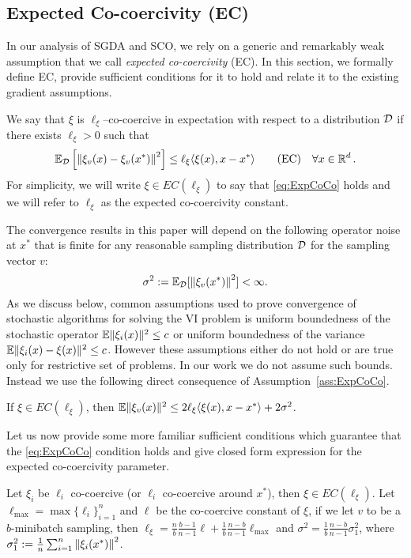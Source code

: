 \documentclass{article}
\begin{document}
\subsection{Expected Co-coercivity (EC)}
In our analysis of SGDA and SCO, we rely on a generic and remarkably weak assumption that we call \emph{expected co-coercivity} (EC).  In this section, we formally define EC, provide sufficient conditions for it to hold and relate it to the existing gradient assumptions.
\begin{assumption}
\label{ass:ExpCoCo} We say that $\xi$ is $\ell_{\xi}$--co-coercive in expectation with respect to a distribution ${\cal D}$ if there exists  $\ell_{\xi}>0$  such that
\begin{equation}
\label{eq:ExpCoCo}
\mathbb{E}_{{\cal D}}\left[\left\| \xi_v(x)-\xi_v(x^*)\right\|^2 \right]\leq \ell_{\xi}\langle \xi (x),x-x^*\rangle \tag{EC} \quad \forall x \in \mathbb{R}^d \, .
\end{equation}
For simplicity, we will write $\xi  \in EC(\ell_\xi)$ to say that \ref{eq:ExpCoCo} holds and we will refer to $\ell_{\xi}$ as the expected co-coercivity constant.
\end{assumption}
The convergence results in this paper will depend on the following operator noise at $x^*$ that is finite for any reasonable sampling distribution ${\cal D}$ for the sampling vector $v$:
\begin{equation}
\label{Sigma}
\sigma^2  := \mathbb{E}_{{\cal D}}[\left\| \xi_v(x^*)\right\|^2] < \infty .
\end{equation}
As we discuss below, common assumptions used to prove convergence of stochastic algorithms for solving the VI problem is uniform boundedness of the stochastic operator $\mathbb{E}\|\xi_i(x)\|^2 \leq c$ or uniform boundedness of the variance  $\mathbb{E}\|\xi_i(x)-\xi(x)\|^2 \leq c$. However these assumptions either do not hold or are true only for restrictive set of problems. In our work we do not assume such bounds. Instead we use the following direct consequence of Assumption~\ref{ass:ExpCoCo}.
\begin{lemma}
\label{MainLemma}
If $\xi  \in EC(\ell_\xi)$, then $\mathbb{E} \| \xi_{v} (x)\|^2 \leq 2\ell_{\xi}\langle \xi (x),x-x^*\rangle  + 2 \sigma^2$.
\end{lemma}
\vspace{-2mm}
Let us now provide some more familiar sufficient conditions which
guarantee that the \ref{eq:ExpCoCo} condition holds and give closed form expression for the expected co-coercivity parameter.
\begin{proposition}
\label{PropositionMinibatch}
Let $\xi_i$ be $\ell_i$ co-coercive (or $\ell_i$ co-coercive around $x^*$), then $\xi \in EC(\ell_\xi)$. Let $\ell_{\max}=\max \{\ell_i\}_{i=1}^n$ and $\ell$ be the co-coercive constant of $\xi$, if we let $v$ to be a $b$-minibatch sampling, then
$\ell_\xi = \frac{n}{b}\frac{b-1}{n-1}\ell+\frac{1}{b}\frac{n-b}{n-1} \ell_{\max}$ and $\sigma^2 =\frac{1}{b} \frac{n-b}{n-1} \sigma_1^2$,
where $\sigma_1^2 :=  \frac{1}{n} \sum_{i=1}^n \left\| \xi_i(x^*)\right\|^2$.
\end{proposition}
\end{document}

